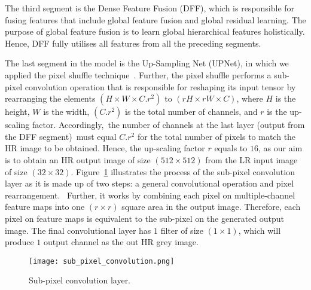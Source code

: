 The third segment is the Dense Feature Fusion (DFF), which is responsible for fusing features that include global feature fusion and global residual learning.
The purpose of global feature fusion is to learn global hierarchical features holistically.
Hence, DFF fully utilises all features from all the preceding segments.

The last segment in the model is the Up-Sampling Net (UPNet), in which we applied the pixel shuffle technique~\cite{Shi2016}.
Further, the pixel shuffle performs a sub-pixel convolution operation that is responsible for reshaping its input tensor by rearranging the elements \((H\times W\times C.r^2)\) to \((rH\times rW\times C)\), where \(H\) is the height, \(W\) is the width, \((C.r^2)\) is the total number of channels, and \(r\) is the up-scaling factor.
Accordingly, the number of channels at the last layer (output from the DFF segment) must equal \(C.r^2\) for the total number of pixels to match the HR image to be obtained.
Hence, the up-scaling factor \(r\) equals to \(16\), as our aim is to obtain an HR output image of size \((512\times 512)\) from the LR input image of size \((32\times 32)\).
Figure~\ref{fig:sub_pixel_layer} illustrates the process of the sub-pixel convolution layer as it is made up of two steps: a general convolutional operation and pixel rearrangement. 
Further, it works by combining each pixel on multiple-channel feature maps into one \((r\times r)\) square area in the output image. 
Therefore, each pixel on feature maps is equivalent to the sub-pixel on the generated output image.
The final convolutional layer has \(1\) filter of size \((1\times 1)\), which will produce \(1\) output channel as the out HR grey image. 
\begin{figure} [h!]
	\begin{center}
		\texttt{[image: sub\_pixel\_convolution.png]}
	\end{center}
	\caption{Sub-pixel convolution layer.} 
	\label{fig:sub_pixel_layer}
\end{figure}

